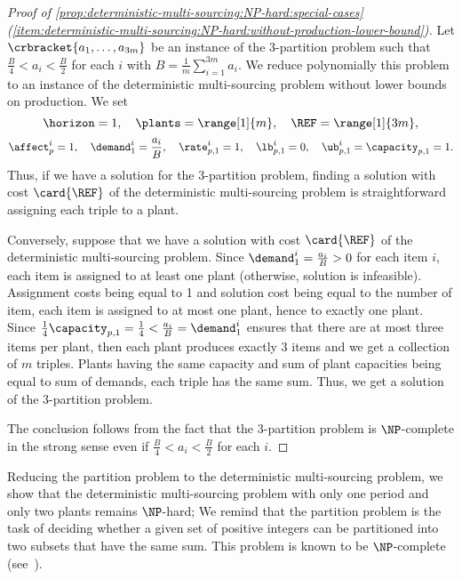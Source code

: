 \begin{proof}[Proof of \cref{prop:deterministic-multi-sourcing:NP-hard:special-cases} (\cref{item:deterministic-multi-sourcing:NP-hard:without-production-lower-bound})]
Let $\crbracket{a_1,\ldots,a_{3m}}$ be an instance of the 3-partition problem such that $\frac{B}{4} < a_i < \frac{B}{2}$ for each $i$ with $B=\frac{1}{m}\sum_{i=1}^{3m}a_i$.
We reduce polynomially this problem to an instance of the deterministic multi-sourcing problem without lower bounds on production.
We set
$$
  \horizon=1
  ,\quad
  \plants=\range[1]{m}
  ,\quad
  \REF=\range[1]{3m},
$$
$$
  \affect_p^i=1
  ,\quad
  \demand_1^i=\frac{a_i}{B}
  ,\quad
  \rate_{p,1}^i=1
  ,\quad
  \lb_{p,1}^i=0
  ,\quad
  \ub_{p,1}^i=\capacity_{p,1}=1.
$$
Thus, if we have a solution for the 3-partition problem, finding a solution with cost $\card{\REF}$ of the deterministic multi-sourcing problem is straightforward assigning each triple to a plant.

Conversely, suppose that we have a solution with cost $\card{\REF}$ of the deterministic multi-sourcing problem.
Since $\demand_1^i=\frac{a_i}{B}>0$ for each item $i$, each item is assigned to at least one plant (otherwise, solution is infeasible).
Assignment costs being equal to 1 and solution cost being equal to the number of item, each item is assigned to at most one plant, hence to exactly one plant.
Since $\frac{1}{4}\capacity_{p,1}=\frac{1}{4} < \frac{a_i}{B} = \demand_1^i$ ensures that there are at most three items per plant, then each plant produces exactly 3 items and we get a collection of $m$ triples.
Plants having the same capacity and sum of plant capacities being equal to sum of demands, each triple has the same sum.
Thus, we get a solution of the 3-partition problem.

The conclusion follows from the fact that the 3-partition problem is $\NP$-complete in the strong sense even if $\frac{B}{4} < a_i < \frac{B}{2}$ for each $i$.
\end{proof}




Reducing the partition problem to the deterministic multi-sourcing problem, we show that the deterministic multi-sourcing problem with only one period and only two plants remains $\NP$-hard;
We remind that the partition problem is the task of deciding whether a given set of positive integers can be partitioned into two subsets that have the same sum.
This problem is known to be $\NP$-complete (see~\cite{Garey1979}).


